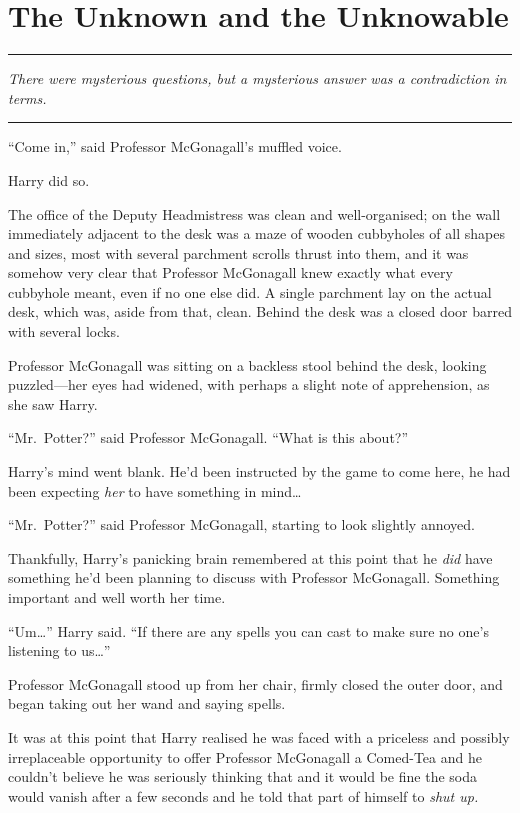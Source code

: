 \chapter{The Unknown and the Unknowable}

\begin{center}\rule{3in}{0.4pt}\end{center}

\emph{There were mysterious questions, but a mysterious answer was a
contradiction in terms.}

\begin{center}\rule{3in}{0.4pt}\end{center}

``Come in,'' said Professor McGonagall's muffled voice.

Harry did so.

The office of the Deputy Headmistress was clean and well-organised; on
the wall immediately adjacent to the desk was a maze of wooden
cubbyholes of all shapes and sizes, most with several parchment scrolls
thrust into them, and it was somehow very clear that Professor
McGonagall knew exactly what every cubbyhole meant, even if no one else
did. A single parchment lay on the actual desk, which was, aside from
that, clean. Behind the desk was a closed door barred with several
locks.

Professor McGonagall was sitting on a backless stool behind the desk,
looking puzzled---her eyes had widened, with perhaps a slight note of
apprehension, as she saw Harry.

``Mr.~Potter?'' said Professor McGonagall. ``What is this about?''

Harry's mind went blank. He'd been instructed by the game to come here,
he had been expecting \emph{her} to have something in mind\ldots{}

``Mr.~Potter?'' said Professor McGonagall, starting to look slightly
annoyed.

Thankfully, Harry's panicking brain remembered at this point that he
\emph{did} have something he'd been planning to discuss with Professor
McGonagall. Something important and well worth her time.

``Um\ldots{}'' Harry said. ``If there are any spells you can cast to
make sure no one's listening to us\ldots{}''

Professor McGonagall stood up from her chair, firmly closed the outer
door, and began taking out her wand and saying spells.

It was at this point that Harry realised he was faced with a priceless
and possibly irreplaceable opportunity to offer Professor McGonagall a
Comed-Tea and he couldn't believe he was seriously thinking that and it
would be fine the soda would vanish after a few seconds and he told that
part of himself to \emph{shut up.}

